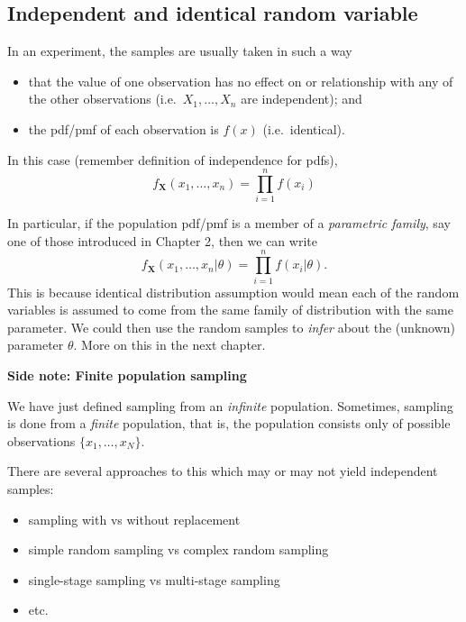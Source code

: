 \documentclass[
]{book}
\providecommand{\tightlist}{%
  \setlength{\itemsep}{0pt}\setlength{\parskip}{0pt}}
\newcommand{\bX}{{\boldsymbol X}}
\theoremstyle{definition}
\theoremstyle{definition}
\theoremstyle{definition}
\theoremstyle{definition}
\theoremstyle{remark}
\begin{document}
\hypertarget{independent-and-identical-random-variable}{%
\subsection{Independent and identical random variable}\label{independent-and-identical-random-variable}}

In an experiment, the samples are usually taken in such a way

\begin{itemize}
\tightlist
\item
  that the value of one observation has no effect on or relationship with any of the other observations (i.e.~\(X_1,\dots,X_n\) are independent); and
\item
  the pdf/pmf of each observation is \(f(x)\) (i.e.~identical).
\end{itemize}

In this case (remember definition of independence for pdfs),\\
\[
f_{\bX}(x_1,\dots,x_n) = \prod_{i=1}^n f(x_i)
\]

In particular, if the population pdf/pmf is a member of a \emph{parametric family}, say one of those introduced in Chapter 2, then we can write
\[
f_{\bX}(x_1,\dots,x_n|\theta) = \prod_{i=1}^n f(x_i|\theta).
\]
This is because identical distribution assumption would mean each of the random variables is assumed to come from the same family of distribution with the same parameter.
We could then use the random samples to \emph{infer} about the (unknown) parameter \(\theta\). More on this in the next chapter.

\textbf{Side note: Finite population sampling}

We have just defined sampling from an \emph{infinite} population. Sometimes, sampling is done from a \emph{finite} population, that is, the population consists only of possible observations \(\{x_1,\dots,x_N \}\).

There are several approaches to this which may or may not yield independent samples:

\begin{itemize}
\tightlist
\item
  sampling with vs without replacement
\item
  simple random sampling vs complex random sampling
\item
  single-stage sampling vs multi-stage sampling
\item
  etc.
\end{itemize}
\end{document}
